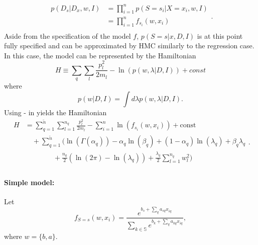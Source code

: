 \begin{example}
	\begin{equation}
		\begin{split}
			p(D_s|D_x,w,I) &=\prod_{i=1}^{n}p(S = s_i|X = x_i,w,I)\\
			&=\prod_{i=1}^{n}f_{s_i}(w,x_i)\\
		\end{split}.
		\label{lik}
	\end{equation}
	Aside from the specification of the model $f$, $p(S= s|x,D,I)$ is at this point fully specified and can be approximated by HMC similarly to the regression case. In this case, the model can be represented by the Hamiltonian 
	\begin{equation}
		H \equiv  \sum_{q}\sum_{l}\frac{p_{l}^2}{2m_{l}}-\ln(p(w,\lambda|D,I))+const
		\label{ham3}
	\end{equation}
	where
	\begin{equation}
		p(w|D,I) = \int d\lambda p(w,\lambda|D,I).
	\end{equation}
	Using - in  yields the Hamiltonian
	\begin{equation}
		\begin{split}
			H&=\sum_{q=1}^{\tilde{n}}\sum_{l=1}^{n_q}\frac{p_{l}^2}{2m_{l}}-\sum_{i=1}^{n}\ln(f_{s_i}(w,x_i))+\text{const}\\
			&\quad+\sum_{q=1}^{\tilde{n}}\bigg(\ln(\Gamma(\alpha_q))-\alpha_q\ln(\beta_q)+(1-\alpha_q)\ln(\lambda_q)+\beta_q\lambda_q\\
			&\qquad \qquad+\frac{n_q}{2}(\ln(2\pi)-\ln(\lambda_q))+\frac{\lambda_q}{2}\sum_{l=1}^{n_q}w_l^2\bigg)\\
		\end{split}.
		\label{ham2}
	\end{equation}
	
	\paragraph{Simple model:} Let
	\begin{equation}
		f_{S = s}(w,x_i) = \frac{e^{b_s+\sum_{q}a_{sq}x_{iq}}}{\sum_{k\in \mathbb{S}}e^{b_k+\sum_{q}a_{kq}x_{iq}}},
		\label{eq:f1}
	\end{equation}
	where $w = \{b,a\}$.
	

\end{example}
